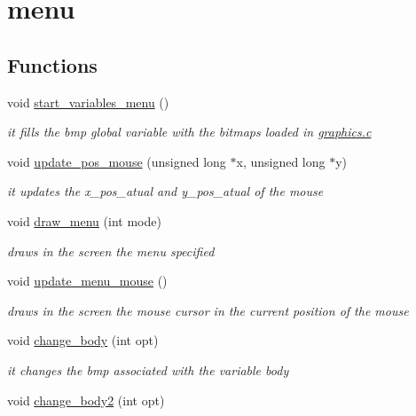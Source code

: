 \hypertarget{group__menu}{}\section{menu}
\label{group__menu}
\subsection*{Functions}
\begin{DoxyCompactItemize}
\item 
void \hyperlink{group__menu_gaa00e45cbd295e588746a7f2fd88b0d20}{start\+\_\+variables\+\_\+menu} ()
\begin{DoxyCompactList}\small\item\em it fills the bmp global variable with the bitmaps loaded in \hyperlink{graphics_8c}{graphics.\+c} \end{DoxyCompactList}\item 
void \hyperlink{group__menu_gab149955bb30c6e7a2923c73e86c09ac9}{update\+\_\+pos\+\_\+mouse} (unsigned long $\ast$x, unsigned long $\ast$y)
\begin{DoxyCompactList}\small\item\em it updates the x\+\_\+pos\+\_\+atual and y\+\_\+pos\+\_\+atual of the mouse \end{DoxyCompactList}\item 
void \hyperlink{group__menu_ga937fb72019d190110b15fdf01d17992b}{draw\+\_\+menu} (int mode)
\begin{DoxyCompactList}\small\item\em draws in the screen the menu specified \end{DoxyCompactList}\item 
void \hyperlink{group__menu_gab1b3c1e3e90e9c78f31cddcc2544fd09}{update\+\_\+menu\+\_\+mouse} ()
\begin{DoxyCompactList}\small\item\em draws in the screen the mouse cursor in the current position of the mouse \end{DoxyCompactList}\item 
void \hyperlink{group__menu_ga95721c20a1fd0be4884cd0a0f8168f53}{change\+\_\+body} (int opt)
\begin{DoxyCompactList}\small\item\em it changes the bmp associated with the variable body \end{DoxyCompactList}\item 
void \hyperlink{group__menu_ga8f65ea2dd45c3b01b9f3752fc04745db}{change\+\_\+body2} (int opt)

\end{DoxyCompactItemize}
